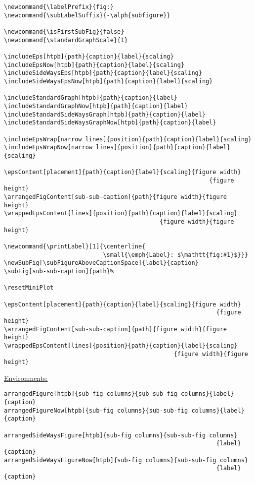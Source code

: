 \documentclass[12pt,a4paper]{article}
\begin{document}
\begin{verbatim}
\newcommand{\labelPrefix}{fig:}
\newcommand{\subLabelSuffix}{-\alph{subfigure}}

\newcommand{\isFirstSubFig}{false}
\newcommand{\standardGraphScale}{1}

\includeEps[htpb]{path}{caption}{label}{scaling}
\includeEpsNow[htpb]{path}{caption}{label}{scaling}
\includeSideWaysEps[htpb]{path}{caption}{label}{scaling}
\includeSideWaysEpsNow[htpb]{path}{caption}{label}{scaling}

\includeStandardGraph[htpb]{path}{caption}{label}
\includeStandardGraphNow[htpb]{path}{caption}{label}
\includeStandardSideWaysGraph[htpb]{path}{caption}{label}
\includeStandardSideWaysGraphNow[htpb]{path}{caption}{label}

\includeEpsWrap[narrow lines]{position}{path}{caption}{label}{scaling}
\includeEpsWrapNow[narrow lines]{position}{path}{caption}{label}{scaling}

\epsContent[placement]{path}{caption}{label}{scaling}{figure width}
                                                          {figure height}
\arrangedFigContent[sub-sub-caption]{path}{figure width}{figure height}
\wrappedEpsContent[lines]{position}{path}{caption}{label}{scaling}
                                            {figure width}{figure height}

\newcommand{\printLabel}[1]{\centerline{
                            \small{\emph{Label}: $\mathtt{fig:#1}$}}}
\newSubFig[\subFigureAboveCaptionSpace]{label}{caption}
\subFig[sub-sub-caption]{path}%

\resetMiniPlot

\epsContent[placement]{path}{caption}{label}{scaling}{figure width}
                                                            {figure height}
\arrangedFigContent[sub-sub-caption]{path}{figure width}{figure height}
\wrappedEpsContent[lines]{position}{path}{caption}{label}{scaling}
                                                {figure width}{figure height}
\end{verbatim}


\bigskip\bigskip

\underline{Environments:}

\begin{verbatim}
arrangedFigure[htpb]{sub-fig columns}{sub-sub-fig columns}{label}{caption}
arrangedFigureNow[htpb]{sub-fig columns}{sub-sub-fig columns}{label}{caption}

arrangedSideWaysFigure[htpb]{sub-fig columns}{sub-sub-fig columns}
                                                            {label}{caption}
arrangedSideWaysFigureNow[htpb]{sub-fig columns}{sub-sub-fig columns}
                                                            {label}{caption}
\end{verbatim}                                                          
\end{document}
